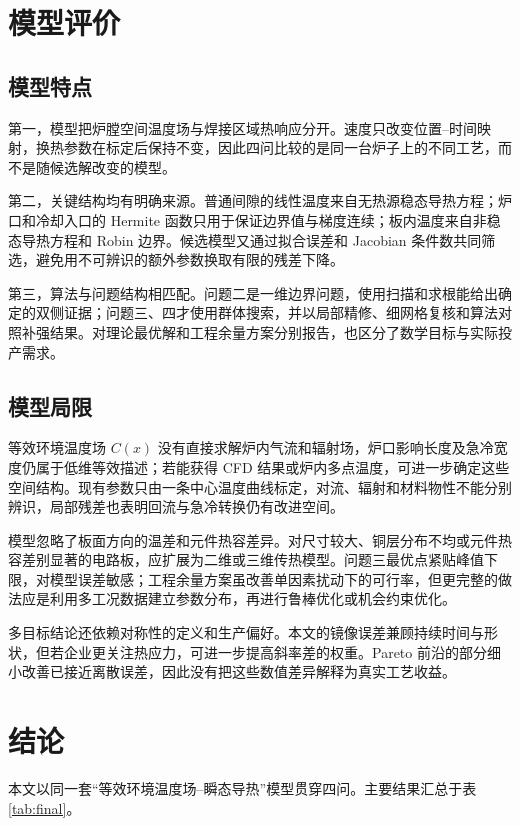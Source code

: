 \section{模型评价}

\subsection{模型特点}

第一，模型把炉膛空间温度场与焊接区域热响应分开。速度只改变位置--时间映射，换热参数在标定后保持不变，因此四问比较的是同一台炉子上的不同工艺，而不是随候选解改变的模型。

第二，关键结构均有明确来源。普通间隙的线性温度来自无热源稳态导热方程；炉口和冷却入口的 Hermite 函数只用于保证边界值与梯度连续；板内温度来自非稳态导热方程和 Robin 边界。候选模型又通过拟合误差和 Jacobian 条件数共同筛选，避免用不可辨识的额外参数换取有限的残差下降。

第三，算法与问题结构相匹配。问题二是一维边界问题，使用扫描和求根能给出确定的双侧证据；问题三、四才使用群体搜索，并以局部精修、细网格复核和算法对照补强结果。对理论最优解和工程余量方案分别报告，也区分了数学目标与实际投产需求。

\subsection{模型局限}

等效环境温度场 $C(x)$ 没有直接求解炉内气流和辐射场，炉口影响长度及急冷宽度仍属于低维等效描述；若能获得 CFD 结果或炉内多点温度，可进一步确定这些空间结构。现有参数只由一条中心温度曲线标定，对流、辐射和材料物性不能分别辨识，局部残差也表明回流与急冷转换仍有改进空间。

模型忽略了板面方向的温差和元件热容差异。对尺寸较大、铜层分布不均或元件热容差别显著的电路板，应扩展为二维或三维传热模型。问题三最优点紧贴峰值下限，对模型误差敏感；工程余量方案虽改善单因素扰动下的可行率，但更完整的做法应是利用多工况数据建立参数分布，再进行鲁棒优化或机会约束优化。

多目标结论还依赖对称性的定义和生产偏好。本文的镜像误差兼顾持续时间与形状，但若企业更关注热应力，可进一步提高斜率差的权重。Pareto 前沿的部分细小改善已接近离散误差，因此没有把这些数值差异解释为真实工艺收益。

\section{结论}

本文以同一套“等效环境温度场--瞬态导热”模型贯穿四问。主要结果汇总于表 \ref{tab:final}。

